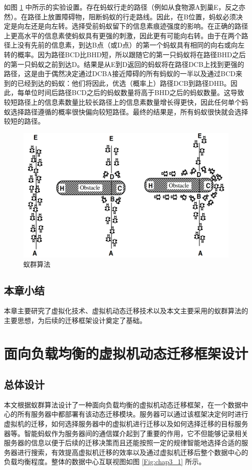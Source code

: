 如图 \ref{Fig:chap2_6} 中所示的实验设置。存在蚂蚁行走的路径（例如从食物源A到巢E，反之亦然）。在路径上放置障碍物，阻断蚂蚁的行走路线。因此，在B位置，蚂蚁必须决定是向左还是向左转。选择受前蚂蚁留下的信息素痕迹强度的影响。在正确的路径上更高水平的信息素使蚂蚁具有更强的刺激，因此更有可能向右转。由于在两个路径上没有先前的信息素，到达B点（或D点）的第一个蚂蚁具有相同的向右或向左转的概率。因为路径BCD比BHD短，所以跟随它的第一只蚂蚁将在路径BHD之后的第一只蚂蚁之前到达D。结果是从E到D返回的蚂蚁将在路径DCB上找到更强的路径，这是由于偶然决定通过DCBA接近障碍的所有蚂蚁的一半以及通过BCD来到的已经到达的蚂蚁：他们将因此，优选（概率上）路径DCB到路径DHB。因此，每单位时间后路径BCD之后的蚂蚁数量将高于BHD之后的蚂蚁数量。这导致较短路径上的信息素数量比较长路径上的信息素数量增长得更快，因此任何单个蚂蚁选择路径遵循的概率很快偏向较短路径。最终的结果是，所有蚂蚁很快就会选择较短的路径。

\begin{figure}[htbp]
  \centering
  \includegraphics{./Figure/IMG_Chap2_6.png}
  \caption{蚁群算法}\label{Fig:chap2_6}
\end{figure}

\section{本章小结}
本章主要研究了虚拟化技术、虚拟机动态迁移技术以及本文主要采用的蚁群算法的主要思想，为后续的迁移框架设计奠定了基础。

\chapter{面向负载均衡的虚拟机动态迁移框架设计}

\section{总体设计}
本文根据蚁群算法设计了一种面向负载均衡的虚拟机动态迁移框架，在一个数据中心的所有服务器中都部署有该动态迁移模块。服务器可以通过该框架决定何时进行虚拟机的迁移，如何选择服务器中的虚拟机进行迁移以及如何选择迁移的目标服务器等。智能蚂蚁作为服务器间的通信媒介起到了重要的作用，它不但能够记录相关服务器的信息以便于后续的迁移决策而且还能按照一定的规律智能地选择合适的服务器进行搜索，有效提高虚拟机迁移的效率以及通过虚拟机迁移后整个数据中心的负载均衡程度。整体的数据中心互联视图如图 \ref{Fig:chap3_1} 所示。

